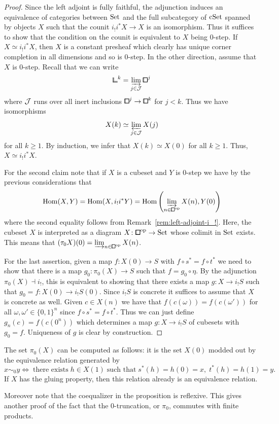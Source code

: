 \begin{proof}
Since the left adjoint is fully faithful, the adjunction induces an equivalence of categories
between $\mathrm{Set}$ and the full subcategory of $\mathrm{cSet}$ spanned by objects $X$ such that the
counit $i_!i^\ast X\to X$ is an isomorphism.
Thus it suffices to show that the condition on the counit is equivalent to $X$ being $0$-step.
If $X\simeq i_!i^\ast X$, then $X$ is a constant presheaf which clearly has unique corner completion
in all dimensions and so is $0$-step.
In the other direction, assume that $X$ is $0$-step.
Recall that we can write
\[
    {\bbcor}^k = \varinjlim_{j\in\cJ}{\bbox}^j
\]
where $\mathcal{J}$ runs over all inert inclusions ${\bbox}^j\to{\bbox}^k$ for $j<k$.
Thus we have isomorphisms
\[
    X(k)\simeq\varprojlim_{j\in\mathcal{J}}X(j)
\]
for all $k\geq 1$.
By induction, we infer that $X(k)\simeq X(0)$ for all $k\geq 1$.
Thus, $X\simeq i_!i^\ast X$.

For the second claim note that if $X$ is a cubeset and $Y$ is $0$-step
we have by the previous considerations that
\[
    \hom(X,Y) = \hom(X,i_!i^\ast Y) = \hom\left(\varinjlim_{n\in{\bbox}^\op} X(n),Y(0)\right)
\]
where the second equality follows from Remark~\ref{rem:left-adjoint-i_!}.
Here, the cubeset $X$ is interpreted as a diagram $X\colon{\bbox}^\op\to\set$
whose colimit in $\mathrm{Set}$ exists.
This means that $(\tau_0X)(0) = \varinjlim_{n\in{\bbox}^\op} X(n)$.

For the last assertion, given a map $f\colon X(0)\to S$ with $f\circ s^\ast = f\circ t^\ast$
we need to show that there is a map $g_0\colon\pi_0(X)\to S$ such that $f = g_0\circ\eta$.
By the adjunction $\pi_0(X)\dashv i_!$, this is equivalent to showing that there exists a map
$g\colon X\to i_!S$ such that $g_0 = f\colon X(0)\to i_!S(0)$.
Since $i_!S$ is concrete it suffices to assume that $X$ is concrete as well.
Given $c\in X(n)$ we have that $f(c(\omega)) = f(c(\omega'))$ for all $\omega,\omega'\in\{0,1\}^n$
since $f\circ s^\ast = f\circ t^\ast$.
Thus we can just define $g_n(c) = f(c(0^n))$ which determines a map $g\colon X\to i_!S$ of cubesets with $g_0 = f$.
Uniqueness of $g$ is clear by construction.
\end{proof}

\begin{remark}
The set $\pi_0(X)$ can be computed as follows:
it is the set $X(0)$ modded out by the equivalence relation generated by
\[
    x\sim_0 y\iff\;\text{there exists}\; h\in X(1)\;\text{such that}\; s^\ast(h) = h(0) = x,\; t^\ast(h) = h(1) = y.
\]
If $X$ has the gluing property, then this relation already is an equivalence relation.

Moreover note that the coequalizer in the proposition is reflexive.
This gives another proof of the fact that the $0$-truncation, or $\pi_0$, commutes with finite products.
\end{remark}

